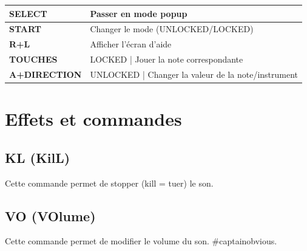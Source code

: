 \documentclass[12pt,a4paper]{article}
\begin{document}
        \tablelasttail{\hline}
        \begin{supertabular}{|l|p{11cm}|}
        \hline
            {\bf SELECT} & Passer en mode popup \\
            \hline
            {\bf START} & Changer le mode (UNLOCKED/LOCKED) \\
            \hline
            {\bf R+L} & Afficher l'écran d'aide \\
            \hline
            {\bf TOUCHES} & LOCKED | Jouer la note correspondante \\
            \hline
            {\bf A+DIRECTION} & UNLOCKED | Changer la valeur de la note/instrument \\ 
        \hline
        \end{supertabular}
    
  \section{Effets et commandes}
  
  
  \subsection{KL (KilL)}
  
  Cette commande permet de stopper (kill = tuer) le son. 

  \subsection{VO (VOlume)}

  Cette commande permet de modifier le volume du son. \#captainobvious.

  
\end{document}
